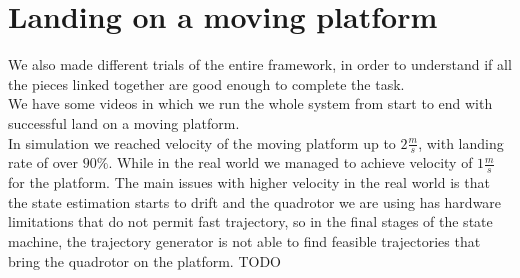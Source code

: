 \section{Landing on a moving platform}
We also made different trials of the entire framework, in order to understand if all the pieces linked together are good enough to complete the task.\\
We have some videos in which we run the whole system from start to end with successful land on a moving platform.\\

In simulation we reached velocity of the moving platform up to $2\frac{m}{s}$, with landing rate of over $90\%$.
While in the real world we managed to achieve velocity of $1\frac{m}{s}$ for the platform. The main issues with higher velocity in the real world is that the state estimation starts to drift and the quadrotor we are using has hardware limitations that do not permit fast trajectory, so in the final stages of the state machine, the trajectory generator is not able to find feasible trajectories that bring the quadrotor on the platform. TODO

